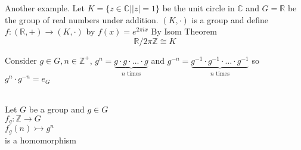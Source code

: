 \documentclass{article}
\begin{document}
Another example. Let 
$K = \{z \in \mathbb{C} | |z| = 1\}$ be the unit circle in $\mathbb{C}$ and $G = \mathbb{R}$ be the group of real numbers under addition.
$(K, \cdot) $ is a group and define $f : (\mathbb{R }, + ) \rightarrow (K, \cdot)$ by $f(x) = e^{2\pi i x}$ By Isom Theorem $$\mathbb{R} / 2\pi\mathbb{Z} \cong K$$

Consider $g \in G, n\in \mathbb{Z}^+$, $g^n = \underbrace{g \cdot g \cdot \ldots \cdot g}_{n \text{ times}}$ and $g^{-n} = \underbrace{g^{-1} \cdot g^{-1} \cdot \ldots \cdot g^{-1}}_{n \text{ times}}$ so $g^n \cdot g^{-n} = e_G$


\begin{proposition}[2.6.1] \leavevmode \\ 
    Let $G$ be a group and $g \in G$ \\ 
    $f_g: \mathbb{Z} \rightarrow G$ \\ 
    $f_g(n) \rightarrowtail g^n$ \\
    is a homomorphism
    
\end{proposition}
\end{document}
